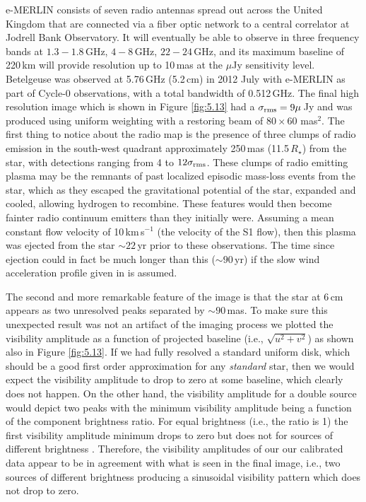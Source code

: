 e-MERLIN \citep{muxlow_2003} consists of seven radio antennas spread out across the United Kingdom that are connected via a fiber optic network to a central correlator at Jodrell Bank Observatory. It will eventually be able to observe in three frequency bands at $1.3-1.8$\,GHz, $4-8$\,GHz, $22-24$\,GHz, and its maximum baseline of 220\,km will provide resolution up to 10\,mas at the $\mu$Jy sensitivity level. Betelgeuse was observed at 5.76\,GHz (5.2\,cm) in 2012 July with e-MERLIN as part of Cycle-0 observations, with a total bandwidth of 0.512\,GHz. The final high resolution image which is shown in Figure \ref{fig:5.13} had a $\sigma _{\rm{rms}}=9\mu$\,Jy and was produced using uniform weighting with a restoring beam of $80\times 60$ mas$^2$. The first thing to notice about the radio map is the presence of three clumps of radio emission in the south-west quadrant approximately 250\,mas (11.5\,$R_{\star}$) from the star, with detections ranging from 4 to $12\sigma _{\rm{rms}}$. These clumps of radio emitting plasma may be the remnants of past localized episodic mass-loss events from the star, which as they escaped the gravitational potential of the star, expanded and cooled, allowing hydrogen to recombine. These features would then become fainter radio continuum emitters than they initially were. Assuming a mean constant flow velocity of 10\,km\,s$^{-1}$ (the velocity of the S1 flow), then this plasma was ejected from the star $\sim 22$\,yr prior to these observations. The time since ejection could in fact be much longer than this ($\sim 90$\,yr) if the slow wind acceleration profile given in \cite{harper_2001} is assumed.

The second and more remarkable feature of the image is that the star at 6\,cm appears as two unresolved peaks separated by $\sim 90$\,mas. To make sure this unexpected result was not an artifact of the imaging process we plotted the visibility amplitude as a function of projected baseline (i.e., $\sqrt{u^2 + v^2}$) as shown also in Figure \ref{fig:5.13}. If we had fully resolved a standard uniform disk, which should be a good first order approximation for any \textit{standard} star, then we would expect the visibility amplitude to drop to zero at some baseline, which clearly does not happen. On the other hand, the visibility amplitude for a double source would depict two peaks with the minimum visibility amplitude being a function of the component brightness ratio. For equal brightness (i.e., the ratio is 1) the first visibility amplitude minimum drops to zero but does not for sources of different brightness \citep{saha_2011}. Therefore, the visibility amplitudes of our our calibrated data appear to be in agreement with what is seen in the final image, i.e., two sources of different brightness producing a sinusoidal visibility pattern which does not drop to zero. 


